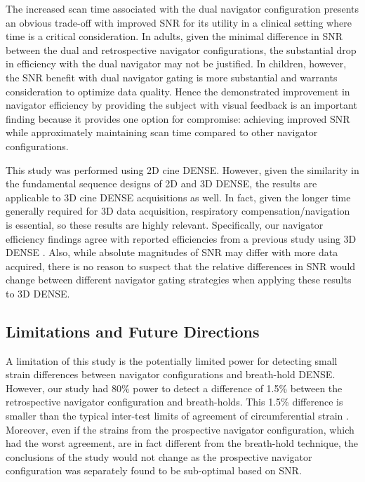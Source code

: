 	The increased scan time associated with the dual navigator configuration presents an obvious trade-off with improved SNR for its utility in a clinical setting where time is a critical consideration. In adults, given the minimal difference in SNR between the dual and retrospective navigator configurations, the substantial drop in efficiency with the dual navigator may not be justified. In children, however, the SNR benefit with dual navigator gating is more substantial and warrants consideration to optimize data quality. Hence the demonstrated improvement in navigator efficiency by providing the subject with visual feedback is an important finding because it provides one option for compromise: achieving improved SNR while approximately maintaining scan time compared to other navigator configurations.
	
	This study was performed using 2D cine DENSE. However, given the similarity in the fundamental sequence designs of 2D and 3D DENSE, the results are applicable to 3D cine DENSE acquisitions as well. In fact, given the longer time generally required for 3D data acquisition, respiratory compensation/navigation is essential, so these results are highly relevant. Specifically, our navigator efficiency findings agree with reported efficiencies from a previous study using 3D DENSE \cite{Zhong2010a}. Also, while absolute magnitudes of SNR may differ with more data acquired, there is no reason to suspect that the relative differences in SNR would change between different navigator gating strategies when applying these results to 3D DENSE.
	
\subsection{Limitations and Future Directions}
	
	A limitation of this study is the potentially limited power for detecting small strain differences between navigator configurations and breath-hold DENSE. However, our study had 80\% power to detect a difference of 1.5\% between the retrospective navigator configuration and breath-holds. This 1.5\% difference is smaller than the typical inter-test limits of agreement of circumferential strain \cite{Wehner2015a}. Moreover, even if the strains from the prospective navigator configuration, which had the worst agreement, are in fact different from the breath-hold technique, the conclusions of the study would not change as the prospective navigator configuration was separately found to be sub-optimal based on SNR.
	
